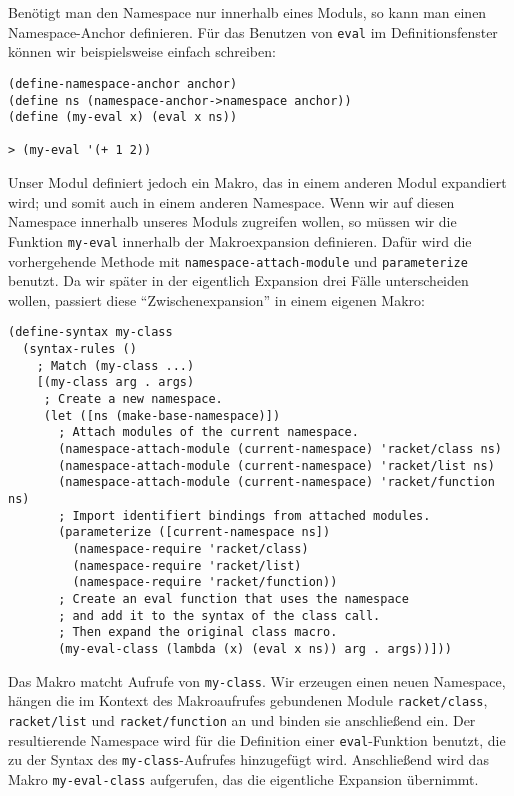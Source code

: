 Benötigt man den Namespace nur innerhalb eines Moduls, so kann man einen Namespace-Anchor definieren. Für das Benutzen von \texttt{eval} im Definitionsfenster können wir beispielsweise einfach schreiben:

\begin{lstlisting}
(define-namespace-anchor anchor)
(define ns (namespace-anchor->namespace anchor))
(define (my-eval x) (eval x ns))

> (my-eval '(+ 1 2))
\end{lstlisting}
{}

Unser Modul definiert jedoch ein Makro, das in einem anderen Modul expandiert wird; und somit auch in einem anderen Namespace. Wenn wir auf diesen Namespace innerhalb unseres Moduls zugreifen wollen, so müssen wir die Funktion \texttt{my-eval} innerhalb der Makroexpansion definieren. Dafür wird die vorhergehende Methode mit \texttt{namespace-attach-module} und \texttt{parameterize} benutzt. Da wir später in der eigentlich Expansion drei Fälle unterscheiden wollen, passiert diese ``Zwischenexpansion'' in einem eigenen Makro:

\begin{lstlisting}
(define-syntax my-class
  (syntax-rules ()
    ; Match (my-class ...)
    [(my-class arg . args)
     ; Create a new namespace.
     (let ([ns (make-base-namespace)])
       ; Attach modules of the current namespace.
       (namespace-attach-module (current-namespace) 'racket/class ns)
       (namespace-attach-module (current-namespace) 'racket/list ns)
       (namespace-attach-module (current-namespace) 'racket/function ns)
       ; Import identifiert bindings from attached modules.
       (parameterize ([current-namespace ns])
         (namespace-require 'racket/class)
         (namespace-require 'racket/list)
         (namespace-require 'racket/function))
       ; Create an eval function that uses the namespace
       ; and add it to the syntax of the class call.
       ; Then expand the original class macro.
       (my-eval-class (lambda (x) (eval x ns)) arg . args))]))
\end{lstlisting}

Das Makro matcht Aufrufe von \texttt{my-class}. Wir erzeugen einen neuen Namespace, hängen die im Kontext des Makroaufrufes gebundenen Module \texttt{racket/class}, \texttt{racket/list} und \texttt{racket/function} an und binden sie anschließend ein. Der resultierende Namespace wird für die Definition einer \texttt{eval}-Funktion benutzt, die zu der Syntax des \texttt{my-class}-Aufrufes hinzugefügt wird. Anschließend wird das Makro \texttt{my-eval-class} aufgerufen, das die eigentliche Expansion übernimmt.


